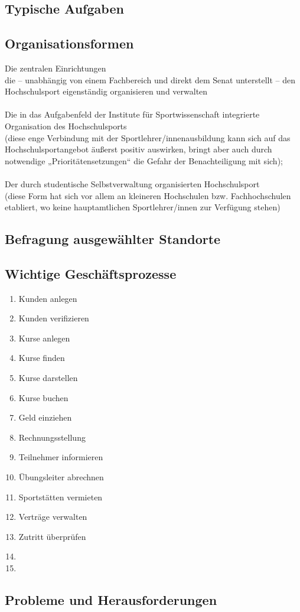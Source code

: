 \subsection{Typische Aufgaben}
\subsection{Organisationsformen}
Die zentralen Einrichtungen\\
die – unabhängig von einem Fachbereich und direkt dem Senat unterstellt – den Hochschulsport eigenständig organisieren und verwalten
\\ \\
Die in das Aufgabenfeld der Institute für Sportwissenschaft integrierte Organisation des Hochschulsports \\
(diese enge Verbindung mit der Sportlehrer/innenausbildung kann sich auf das Hochschulsportangebot äußerst positiv auswirken, bringt aber auch durch notwendige „Prioritätensetzungen“ die Gefahr der Benachteiligung mit sich);
\\ \\
Der durch studentische Selbstverwaltung organisierten Hochschulsport \\
(diese Form hat sich vor allem an kleineren Hochschulen bzw. Fachhochschulen etabliert, wo keine hauptamtlichen Sportlehrer/innen zur Verfügung stehen)
\cite[vgl.][]{Radde.1996}


\subsection{Befragung ausgewählter Standorte}
\subsection{Wichtige Geschäftsprozesse}
\begin{enumerate}
\item Kunden anlegen
\item Kunden verifizieren
\item Kurse anlegen
\item Kurse finden
\item Kurse darstellen
\item Kurse buchen
\item Geld einziehen
\item Rechnungsstellung
\item Teilnehmer informieren
\item Übungsleiter abrechnen
\item Sportstätten vermieten
\item Verträge verwalten
\item Zutritt überprüfen
\item 
\item 
\end{enumerate}
\subsection{Probleme und Herausforderungen}